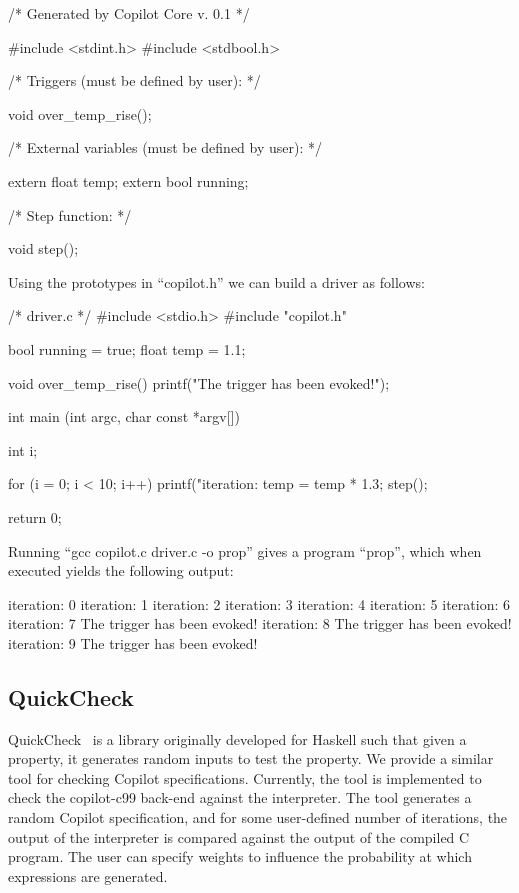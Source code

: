 \begin{code}
/* Generated by Copilot Core v. 0.1 */

#include <stdint.h>
#include <stdbool.h>

/* Triggers (must be defined by user): */

void over_temp_rise();

/* External variables (must be defined by user): */

extern float temp;
extern bool running;

/* Step function: */

void step();
\end{code}

Using the prototypes in ``copilot.h'' we can build a driver as follows:

\begin{code}
/* driver.c */
#include <stdio.h>
#include "copilot.h"

bool running = true;
float temp = 1.1;

void over_temp_rise()
{
  printf("The trigger has been evoked!\n");
}

int main (int argc, char const *argv[])
{
  int i;

  for (i = 0; i < 10; i++)
  {
    printf("iteration: %
    temp = temp * 1.3;
    step();
  }

  return 0;
}
\end{code}

Running ``gcc copilot.c driver.c -o prop'' gives a program ``prop'', which when executed
yields the following output:
%
\begin{code}
iteration: 0
iteration: 1
iteration: 2
iteration: 3
iteration: 4
iteration: 5
iteration: 6
iteration: 7
The trigger has been evoked!
iteration: 8
The trigger has been evoked!
iteration: 9
The trigger has been evoked!
\end{code}
%

\subsection{QuickCheck}
QuickCheck~\cite{qc} is a library originally developed for Haskell such that
given a property, it generates random inputs to test the property.  We provide a
similar tool for checking Copilot specifications.  Currently, the tool is
implemented to check the copilot-c99 back-end against the interpreter.  The tool
generates a random Copilot specification, and for some user-defined number of
iterations, the output of the interpreter is compared against the output of the
compiled C program.  The user can specify weights to influence the probability
at which expressions are generated.  

